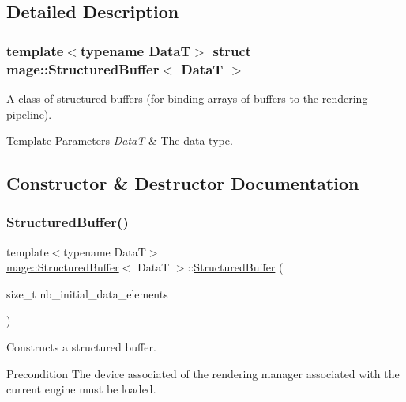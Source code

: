 \subsection{Detailed Description}
\subsubsection*{template$<$typename DataT$>$\newline
struct mage\+::\+Structured\+Buffer$<$ Data\+T $>$}

A class of structured buffers (for binding arrays of buffers to the rendering pipeline).


\begin{DoxyTemplParams}{Template Parameters}
{\em DataT} & The data type. \\
\hline
\end{DoxyTemplParams}


\subsection{Constructor \& Destructor Documentation}
\hypertarget{structmage_1_1_structured_buffer_ad384318eca9a617f61f81472ea68f32e}{}\label{structmage_1_1_structured_buffer_ad384318eca9a617f61f81472ea68f32e} 
\subsubsection{\texorpdfstring{Structured\+Buffer()}{StructuredBuffer()}\hspace{0.1cm}{\footnotesize\ttfamily [1/4]}}
{\footnotesize\ttfamily template$<$typename DataT$>$ \\
\hyperlink{structmage_1_1_structured_buffer}{mage\+::\+Structured\+Buffer}$<$ DataT $>$\+::\hyperlink{structmage_1_1_structured_buffer}{Structured\+Buffer} (\begin{DoxyParamCaption}\item[{size\+\_\+t}]{nb\+\_\+initial\+\_\+data\+\_\+elements }\end{DoxyParamCaption})\hspace{0.3cm}{\ttfamily [explicit]}}

Constructs a structured buffer.

\begin{DoxyPrecond}{Precondition}
The device associated of the rendering manager associated with the current engine must be loaded. 
\end{DoxyPrecond}

